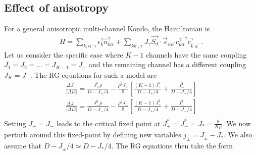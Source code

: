 \documentclass{revtex4-2}
\numberwithin{equation}{section}
\begin{document}
\subsection{Effect of anisotropy}
For a general anisotropic multi-channel Kondo, the Hamiltonian is
\begin{equation}\begin{aligned}
	H = \sum_{k,\alpha,\gamma}\epsilon_{k}^\gamma \hat n^\gamma_{k\alpha} + \sum_{kk^\prime,\gamma}J_\gamma \vec{S_d}\cdot\vec{s}_{\alpha\alpha^\prime}{c^\gamma_{k\alpha}}^\dagger c^\gamma_{k^\prime\alpha^\prime}~.
\end{aligned}\end{equation}
Let us consider the specific case where \(K-1\) channels have the same coupling \(J_1 = J_2 = ... = J_{K-1} = J_+\) and the remaining channel has a different coupling \(J_K = J_-\). The RG equations for such a model are
\begin{equation}\begin{aligned}
	\frac{\Delta J_+}{|\Delta D|} = \frac{J_+^2 \rho}{D - J_+/4} - \frac{\rho^2 J_+}{8}\left[\frac{(K-1)J_+^2}{D - J_+/4} + \frac{J_-^2}{D - J_-/4}\right]\\
	\frac{\Delta J_-}{|\Delta D|} = \frac{J_-^2 \rho}{D - J_-/4} - \frac{\rho^2 J_-}{8}\left[\frac{(K-1)J_+^2}{D - J_+/4} + \frac{J_-^2}{D - J_-/4}\right]\\
\end{aligned}\end{equation}
Setting \(J_+ = J_-\) leads to the critical fixed point at \(J_+^* = J_-^* = J_* = \frac{8}{K \rho}\). We now perturb around this fixed-point by defining new variables \(j_\pm = J_\pm - J_*\). We also assume that \(D - J_\pm / 4 \simeq D - J_*/4\). The RG equations then take the form
\end{document}
